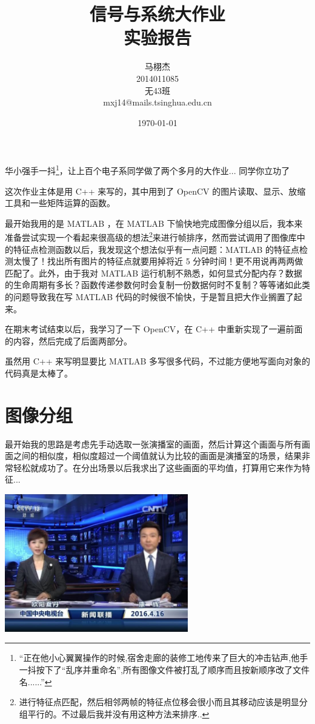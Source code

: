 \documentclass[a4paper, fontset=none]{article}
\title{信号与系统大作业\\实验报告}
\author{马栩杰\\2014011085\\无43班\\mxj14@mails.tsinghua.edu.cn}
\date{\today}
\begin{document}
\maketitle

华小强手一抖\footnote{``正在他小心翼翼操作的时候,宿舍走廊的装修工地传来了巨大的冲击钻声,他手一抖按下了“乱序并重命名”,所有图像文件被打乱了顺序而且按新顺序改了文件名......''}，让上百个电子系同学做了两个多月的大作业... 同学你立功了 \smiley

这次作业主体是用 C++ 来写的，其中用到了 OpenCV 的图片读取、显示、放缩工具和一些矩阵运算的函数。

最开始我用的是 MATLAB ，在 MATLAB 下愉快地完成图像分组以后，我本来准备尝试实现一个看起来很高级的想法\footnote{进行特征点匹配，然后相邻两帧的特征点位移会很小而且其移动应该是明显分组平行的。不过最后我并没有用这种方法来排序..}来进行帧排序，然而尝试调用了图像库中的特征点检测函数以后，我发现这个想法似乎有一点问题：MATLAB 的特征点检测太慢了！找出所有图片的特征点就要用掉将近 5 分钟时间！更不用说再两两做匹配了。此外，由于我对 MATLAB 运行机制不熟悉，如何显式分配内存？数据的生命周期有多长？函数传递参数何时会复制一份数据何时不复制？等等诸如此类的问题导致我在写 MATLAB 代码的时候很不愉快，于是暂且把大作业搁置了起来。

在期末考试结束以后，我学习了一下 OpenCV，在 C++ 中重新实现了一遍前面的内容，然后完成了后面两部分。

虽然用 C++ 来写明显要比 MATLAB 多写很多代码，不过能方便地写面向对象的代码真是太棒了。

\section{图像分组}
\label{sec:图像分组}

最开始我的思路是考虑先手动选取一张演播室的画面，然后计算这个画面与所有画面之间的相似度，相似度超过一个阈值就认为比较的画面是演播室的场景，结果非常轻松就成功了。在分出场景以后我求出了这些画面的平均值，打算用它来作为特征...

\begin{center}
  \includegraphics[width=0.6\textwidth]{./indoor_average.jpg}
\end{center}
\end{document}

